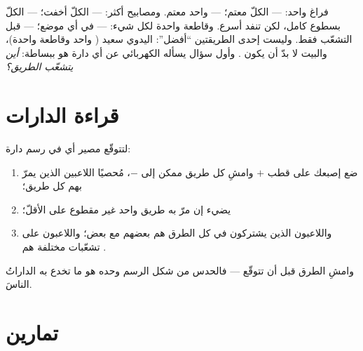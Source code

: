 \begin{remark}\label{rem:g5:series-parallel-circuits:compare}
فراغ واحد:  --- الكلّ معتم؛  ---  واحد
معتم. ومصابيح أكثر:  --- الكلّ أخفت؛  ---
الكلّ بسطوع كامل، لكن  تنفد أسرع. وقاطعة واحدة لكل شيء:
 --- في أي موضع؛  --- قبل التشعّب فقط.
وليست إحدى الطريقتين ``أفضل'':  اليدوي سعيد 
( واحد وقاطعة واحدة)، والبيت لا بدّ أن يكون .
وأول سؤال يسأله الكهربائي عن أي دارة هو ببساطة: \emph{أين
يتشعّب الطريق؟}
\end{remark}

\section{قراءة الدارات}

\begin{method}\label{met:g5:series-parallel-circuits:follow}
لتتوقّع مصير أي  في رسم دارة:
\begin{enumerate}
  \item ضع إصبعك على قطب  $+$ وامشِ كل طريق ممكن إلى
        $-$، مُحصيًا اللاعبين الذين يمرّ بهم كل طريق؛
  \item يضيء  إن مرّ به طريق واحد غير مقطوع على الأقلّ؛
  \item واللاعبون الذين يشتركون في كل الطرق هم  بعضهم
        مع بعض؛ واللاعبون على تشعّبات مختلفة هم .
\end{enumerate}
وامشِ الطرق قبل أن تتوقّع --- فالحدس من شكل الرسم وحده هو ما
تخدع به الداراتُ الناسَ.
\end{method}

\section{تمارين}

